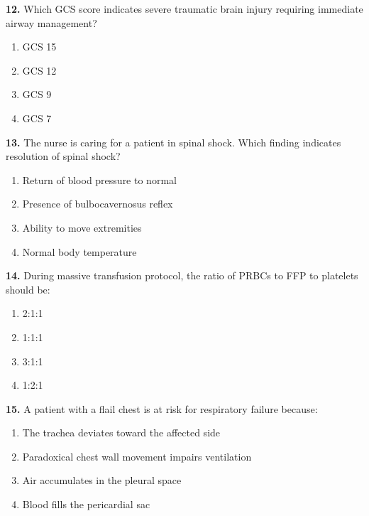 \documentclass[11pt]{article}
\begin{document}
\vspace{0.3cm}

\textbf{12.} Which GCS score indicates severe traumatic brain injury requiring immediate airway management?

\begin{enumerate}[label=\Alph*.]
    \item GCS 15
    \item GCS 12
    \item GCS 9
    \item GCS 7
\end{enumerate}

\vspace{0.3cm}

\textbf{13.} The nurse is caring for a patient in spinal shock. Which finding indicates resolution of spinal shock?

\begin{enumerate}[label=\Alph*.]
    \item Return of blood pressure to normal
    \item Presence of bulbocavernosus reflex
    \item Ability to move extremities
    \item Normal body temperature
\end{enumerate}

\vspace{0.3cm}

\textbf{14.} During massive transfusion protocol, the ratio of PRBCs to FFP to platelets should be:

\begin{enumerate}[label=\Alph*.]
    \item 2:1:1
    \item 1:1:1
    \item 3:1:1
    \item 1:2:1
\end{enumerate}

\vspace{0.3cm}

\textbf{15.} A patient with a flail chest is at risk for respiratory failure because:

\begin{enumerate}[label=\Alph*.]
    \item The trachea deviates toward the affected side
    \item Paradoxical chest wall movement impairs ventilation
    \item Air accumulates in the pleural space
    \item Blood fills the pericardial sac
\end{enumerate}
\end{document}
